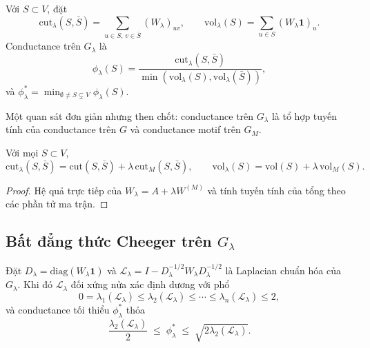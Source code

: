 \begin{definition}
\label{def:wlambda-conductance}
Với $S \subset V$, đặt
\[
    \mathrm{cut}_\lambda(S, \bar S) = \sum_{u \in S,\, v \in \bar S} (W_\lambda)_{uv}, \qquad
    \mathrm{vol}_\lambda(S) = \sum_{u \in S} (W_\lambda \mathbf{1})_u.
\]
Conductance trên $G_\lambda$ là
\[
    \phi_\lambda(S) = \frac{\mathrm{cut}_\lambda(S, \bar S)}{\min(\mathrm{vol}_\lambda(S), \mathrm{vol}_\lambda(\bar S))},
\]
và $\phi_\lambda^* = \min_{\emptyset \neq S \subsetneq V} \phi_\lambda(S)$.
\end{definition}

Một quan sát đơn giản nhưng then chốt: conductance trên $G_\lambda$ là tổ hợp tuyến tính của conductance trên $G$ và conductance motif trên $G_M$.

\begin{proposition}
\label{prop:cut-decomposition}
Với mọi $S \subset V$,
\[
    \mathrm{cut}_\lambda(S, \bar S) = \mathrm{cut}(S, \bar S) + \lambda \, \mathrm{cut}_M(S, \bar S), \qquad
    \mathrm{vol}_\lambda(S) = \mathrm{vol}(S) + \lambda \, \mathrm{vol}_M(S).
\]
\end{proposition}

\begin{proof}
Hệ quả trực tiếp của $W_\lambda = A + \lambda W^{(M)}$ và tính tuyến tính của tổng theo các phần tử ma trận.
\end{proof}

\subsection{Bất đẳng thức Cheeger trên $G_\lambda$}

\begin{theorem}
\label{thm:wlambda-cheeger}
Đặt $D_\lambda = \mathrm{diag}(W_\lambda \mathbf{1})$ và $\mathcal{L}_\lambda = I - D_\lambda^{-1/2} W_\lambda D_\lambda^{-1/2}$ là Laplacian chuẩn hóa của $G_\lambda$. Khi đó $\mathcal{L}_\lambda$ đối xứng nửa xác định dương với phổ
\[
    0 = \lambda_1(\mathcal{L}_\lambda) \leq \lambda_2(\mathcal{L}_\lambda) \leq \cdots \leq \lambda_n(\mathcal{L}_\lambda) \leq 2,
\]
và conductance tối thiểu $\phi_\lambda^*$ thỏa
\[
    \frac{\lambda_2(\mathcal{L}_\lambda)}{2} \;\leq\; \phi_\lambda^* \;\leq\; \sqrt{2 \lambda_2(\mathcal{L}_\lambda)}.
\]
\end{theorem}

